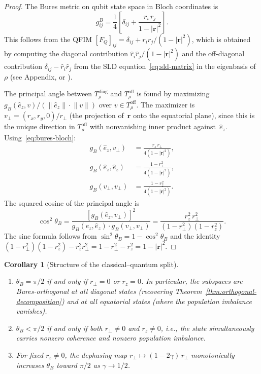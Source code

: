 \documentclass[12pt,a4paper]{article}
\newtheorem{corollary}[theorem]{Corollary}
\theoremstyle{definition}
\theoremstyle{remark}
\begin{document}
\begin{proof}
The Bures metric on qubit state space in Bloch coordinates is
\begin{equation}
\label{eq:bures-bloch}
g_{ij}^B = \frac{1}{4}\!\left[\delta_{ij} + \frac{r_i\, r_j}{1 - |\mathbf{r}|^2}\right].
\end{equation}
This follows from the QFIM $[F_Q]_{ij} = \delta_{ij} + r_i r_j/(1-|\mathbf{r}|^2)$, which is obtained by computing the diagonal contribution $\hat{r}_i \hat{r}_j/(1-|\mathbf{r}|^2)$ and the off-diagonal contribution $\delta_{ij} - \hat{r}_i \hat{r}_j$ from the SLD equation~\eqref{eq:sld-matrix} in the eigenbasis of~$\rho$ (see Appendix, or \cite{braunstein1994statistical}).

The principal angle between $T_\rho^{\mathrm{diag}}$ and $T_\rho^{\mathrm{off}}$ is found by maximizing $g_B(\hat{e}_z, v)/(\lVert\hat{e}_z\rVert \cdot \lVert v\rVert)$ over $v \in T_\rho^{\mathrm{off}}$.  The maximizer is $v_\perp = (r_x, r_y, 0)/r_\perp$ (the projection of~$\mathbf{r}$ onto the equatorial plane), since this is the unique direction in $T_\rho^{\mathrm{off}}$ with nonvanishing inner product against~$\hat{e}_z$.  Using~\eqref{eq:bures-bloch}:
\begin{align*}
g_B(\hat{e}_z, v_\perp) &= \frac{r_z\, r_\perp}{4(1 - |\mathbf{r}|^2)}, \\[3pt]
g_B(\hat{e}_z, \hat{e}_z) &= \frac{1 - r_\perp^2}{4(1 - |\mathbf{r}|^2)}, \\[3pt]
g_B(v_\perp, v_\perp) &= \frac{1 - r_z^2}{4(1 - |\mathbf{r}|^2)}.
\end{align*}
The squared cosine of the principal angle is
\[
\cos^2\theta_B = \frac{[g_B(\hat{e}_z, v_\perp)]^2}{g_B(\hat{e}_z, \hat{e}_z) \cdot g_B(v_\perp, v_\perp)} = \frac{r_z^2\, r_\perp^2}{(1 - r_\perp^2)(1 - r_z^2)}.
\]
The sine formula follows from $\sin^2\theta_B = 1 - \cos^2\theta_B$ and the identity $(1 - r_\perp^2)(1 - r_z^2) - r_z^2 r_\perp^2 = 1 - r_\perp^2 - r_z^2 = 1 - |\mathbf{r}|^2$.
\end{proof}

\begin{corollary}[Structure of the classical--quantum split]
\label{cor:angle-structure}
\quad
\begin{enumerate}
\item[\emph{(i)}] $\theta_B = \pi/2$ if and only if $r_\perp = 0$ \emph{or} $r_z = 0$.  In particular, the subspaces are Bures-orthogonal at all diagonal states (recovering Theorem~\ref{thm:orthogonal-decomposition}) and at all equatorial states (where the population imbalance vanishes).
\item[\emph{(ii)}] $\theta_B < \pi/2$ if and only if both $r_\perp \neq 0$ and $r_z \neq 0$, i.e., the state simultaneously carries nonzero coherence and nonzero population imbalance.
\item[\emph{(iii)}] For fixed $r_z \neq 0$, the dephasing map $r_\perp \mapsto (1-2\gamma)\, r_\perp$ monotonically increases $\theta_B$ toward $\pi/2$ as $\gamma \to 1/2$.
\end{enumerate}
\end{corollary}
\end{document}

